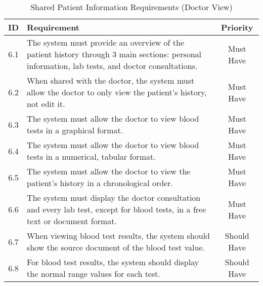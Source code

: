 \begin{table}[h!]
    \centering
    \begin{tabular}{|c|p{10cm}|c|}
    \hline
    \textbf{ID}  & \textbf{Requirement}  & \textbf{Priority} \\ \hline
    6.1  & The system must provide an overview of the patient history through 3 main sections: personal information, lab tests, and doctor consultations. & Must Have \\ \hline
    6.2  & When shared with the doctor, the system must allow the doctor to only view the patient's history, not edit it. & Must Have \\ \hline
    6.3  & The system must allow the doctor to view blood tests in a graphical format. & Must Have \\ \hline
    6.4  & The system must allow the doctor to view blood tests in a numerical, tabular format. & Must Have \\ \hline
    6.5  & The system must allow the doctor to view the patient's history in a chronological order. & Must Have \\ \hline
    6.6  & The system must display the doctor consultation and every lab test, except for blood tests, in a free text or document format. & Must Have \\ \hline
    6.7  & When viewing blood test results, the system should show the source document of the blood test value. & Should Have \\ \hline
    6.8  & For blood test results, the system should display the normal range values for each test. & Should Have \\ \hline
    \end{tabular}
    \caption{Shared Patient Information Requirements (Doctor View)}
\end{table}

